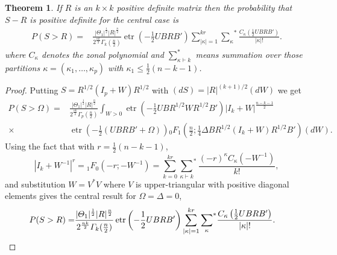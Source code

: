 \documentclass{amsart}
\newtheorem{theorem}{Theorem}[section]
\theoremstyle{definition}
\numberwithin{equation}{section}
\begin{document}
\begin{theorem}If $R$ is an $k \times k$ positive definite matrix then the probability that $S - R$ is positive definite for the central case is
        \[\begin{aligned}
            {P}(S > R) = & \frac{| \varTheta_{1}|^{\frac{1}{2}}|R|^{\frac{n}{2}}}{2^{\frac{nk}{2}}\varGamma_{k}(\frac{n}{2})}\operatorname{etr}\left(-\frac{1}{2} UBRB'\right) \sum_{|\kappa|=1}^{kr} {\sum_{\kappa}}^*\frac{C_{\kappa}\left(\frac{1}{2} UBRB'\right) }{|\kappa|!}.\end{aligned}\]
            where $C_{\kappa}$ denotes the zonal polynomial and $\sum_{\kappa \vdash k}^{*}$ means summation over those partitions $\kappa = (\kappa_{1},\dots,\kappa_{p})$ with $\kappa_{1} \leq \frac{1}{2}(n-k-1)$.
        \end{theorem}
        \begin{proof}Putting $S = R^{1/2}(I_{p} + W)R^{1/2}$ with $(dS) = |R|^{(k+1)/2}(dW)$ we get 
          \[\begin{aligned}
                P(S > \Omega) = & \frac{| \varTheta_{1}|^{\frac{1}{2}}|R|^{\frac{n}{2}}}{2^{\frac{nk}{2}}\varGamma_{p}(\frac{n}{2})} \int_{W>0}  \operatorname{etr} \left(-\frac{1}{2} UBR^{1/2}WR^{1/2}B' \right) |I_{k} + W|^{\frac{n-k-1}{2}} \\
		        \times &\operatorname{etr}\left(-\frac{1}{2} (UBRB'+ \varOmega)\right){}_{0}F_{1}\left(\frac{n}{2};\frac{1}{4} \varDelta BR^{1/2}(I_{k} + W)R^{1/2}B'\right) (dW).
            \end{aligned}
            \]
            Using the fact that with $r = \frac{1}{2}(n-k-1)$,
            \[|I_{k} + W^{-1}|^{r} = {}_{1}F_{0}(-r;-W^{-1}) = \sum_{k=0}^{kr}{\sum_{\kappa \vdash k}}^{*}\frac{(-r)^{\kappa} C_{\kappa}(-W^{-1})}{k!},\]
            and substitution $W = V^{*}V$ where ${V}$ is upper-triangular with positive diagonal elements gives the central result for $\varOmega = \varDelta = 0$,
         \[\begin{aligned}
                {P}(S > R) = & \frac{| \varTheta_{1}|^{\frac{1}{2}}|R|^{\frac{n}{2}}}{2^{\frac{nk}{2}}\varGamma_{k}(\frac{n}{2})}\operatorname{etr}\left(-\frac{1}{2} UBRB'\right) \sum_{|\kappa|=1}^{kr} {\sum_{\kappa}}^*\frac{C_{\kappa}\left({\frac{1}{2} UBRB'}\right) }{|\kappa|!}.\qedhere
            \end{aligned}
            \]
        \end{proof}
        
\end{document}
